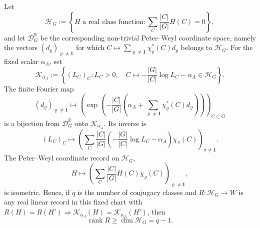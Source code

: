 \begin{corollary}
  Let
  \[
    \mathcal H_G:=
    \left\{H\text{ a real class function}:
      \sum_C\frac{|C|}{|G|}H(C)=0\right\},
  \]
  and let \(\mathcal D_G^{\mathbb R}\) be the corresponding non-trivial
  Peter--Weyl coordinate space, namely the vectors
  \((d_\varrho)_{\varrho\ne\mathbf1}\) for which
  \(C\mapsto\sum_{\varrho\ne\mathbf1}\chi_\varrho^\ast(C)d_\varrho\)
  belongs to \(\mathcal H_G\).  For the fixed scalar \(\alpha_A\), set
  \[
    \mathscr K_{\alpha_A}:=
    \left\{(L_C)_C:
      L_C>0,\quad
      C\longmapsto -\frac{|G|}{|C|}\log L_C-\alpha_A\in\mathcal H_G
    \right\}.
  \]
  The finite Fourier map
  \begin{equation}\label{eq:class-product-rigidity-chart-map}
    (d_\varrho)_{\varrho\ne\mathbf1}
    \longmapsto
    \left(
      \exp\!\left(
        -\frac{|C|}{|G|}
        \left(
          \alpha_A+
          \sum_{\varrho\ne\mathbf1}\chi_\varrho^\ast(C)d_\varrho
        \right)
      \right)
    \right)_{C\subset G}
  \end{equation}
  \label{eq:fixed-coordinate-support-product-map}
  is a bijection from \(\mathcal D_G^{\mathbb R}\) onto
  \(\mathscr K_{\alpha_A}\).  Its inverse is
  \begin{equation}\label{eq:class-product-rigidity-chart-inverse}
    (L_C)_C\longmapsto
    \left(
      \sum_C\frac{|C|}{|G|}
      \left(-\frac{|G|}{|C|}\log L_C-\alpha_A\right)
      \chi_\pi(C)
    \right)_{\pi\ne\mathbf1}.
  \end{equation}
  \label{eq:class-product-rigidity-inverse}
  The Peter--Weyl coordinate record on \(\mathcal H_G\),
  \begin{equation}\label{eq:fixed-coordinate-support-peter-weyl-record}
    H\longmapsto
    \left(
      \sum_C\frac{|C|}{|G|}H(C)\chi_\varrho(C)
    \right)_{\varrho\ne\mathbf1},
  \end{equation}
  is isometric.  Hence, if \(q\) is the number of conjugacy classes and
  \(R:\mathcal H_G\to W\) is any real linear record in this fixed chart with
  \(R(H)=R(H')\Rightarrow \mathcal K_{\alpha_A}(H)=\mathcal K_{\alpha_A}(H')\),
  then
  \begin{equation}\label{eq:fixed-coordinate-support-rank-bound}
    \operatorname{rank}R\ge\dim\mathcal H_G=q-1.
  \end{equation}


\end{corollary}
